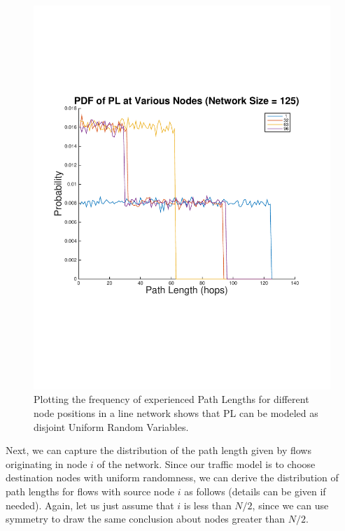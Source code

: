 \begin{figure}
\begin{centering}
    \includegraphics[scale=0.4, clip=true, trim=15mm 65mm 20mm 65mm]{figures/PL_PDFs_each_node_line_net_125.pdf}
    \caption{Plotting the frequency of experienced Path Lengths for different node positions in a line network shows that PL can be modeled as disjoint Uniform Random Variables.}
    \label{fig:PL_PDFs_line_net}
\end{centering}
\end{figure}

Next, we can capture the distribution of the path length given by flows originating in node $i$ of the network.  Since our traffic model is to choose destination nodes with uniform randomness, we can derive the distribution of path lengths for flows with source node $i$ as follows (details can be given if needed).  Again, let us just assume that $i$ is less than $N/2$, since we can use symmetry to draw the same conclusion about nodes greater than $N/2$.

